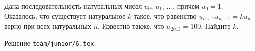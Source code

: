 \problem{}
Дана последовательность натуральных чисел $u_0$, $u_1$, $\ldots$, причем
$u_0 = 1$.
Оказалось, что существует натуральное $k$ такое, что равенство
$u_{n+1} u_{n-1} = k u_n$ верно при всех натуральных $n$.
Известно также, что $u_{2013} = 100$.
Найдите $k$.

\solution Решение \texttt{team/junior/6.tex}.
\endproblem
